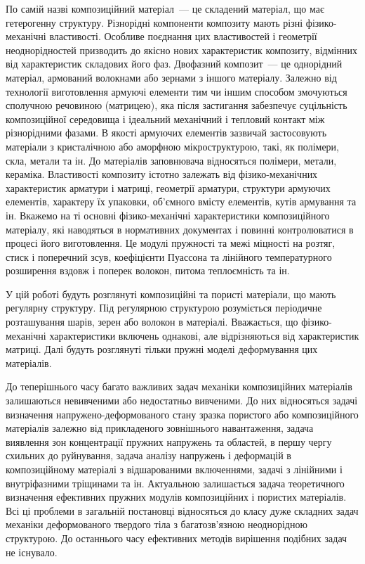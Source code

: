 \documentclass[book,14pt,small,oneside]{ncc}
\begin{document}
По самій назві композиційний матеріал~--- це складений матеріал, що має гетерогенну структуру. Різнорідні компоненти композиту мають різні фізико-механічні властивості. Особливе поєднання цих властивостей і геометрії неоднорідностей призводить до якісно нових характеристик композиту, відмінних від характеристик складових його фаз. Двофазний композит~--- це однорідний матеріал, армований волокнами або зернами з іншого матеріалу. Залежно від технології виготовлення армуючі елементи тим чи іншим способом змочуються сполучною речовиною (матрицею), яка після застигання забезпечує суцільність композиційної середовища і ідеальний механічний і тепловий контакт між різнорідними фазами. В якості армуючих елементів зазвичай застосовують матеріали з кристалічною або аморфною мікроструктурою, такі, як полімери, скла, метали та ін. До матеріалів заповнювача відносяться полімери, метали, кераміка. Властивості композиту істотно залежать від фізико-механічних характеристик арматури і матриці, геометрії арматури, структури армуючих елементів, характеру їх упаковки, об'ємного вмісту елементів, кутів армування та ін. Вкажемо на ті основні фізико-механічні характеристики композиційного матеріалу, які наводяться в нормативних документах і повинні контролюватися в процесі його виготовлення. Це модулі пружності та межі міцності на розтяг, стиск і поперечний зсув, коефіцієнти Пуассона та лінійного температурного розширення вздовж і поперек волокон, питома теплоємність та ін.

У цій роботі будуть розглянуті композиційні та пористі матеріали, що мають регулярну структуру. Під регулярною структурою розуміється періодичне розташування шарів, зерен або волокон в матеріалі. Вважається, що фізико-механічні характеристики включень однакові, але відрізняються від характеристик матриці. Далі будуть розглянуті тільки пружні моделі деформування цих матеріалів.

До теперішнього часу багато важливих задач механіки композиційних матеріалів залишаються невивченими або недостатньо вивченими. До них відносяться задачі визначення напружено-деформованого стану зразка пористого або композиційного матеріалів залежно від прикладеного зовнішнього навантаження, задача виявлення зон концентрації пружних напружень та областей, в першу чергу схильних до руйнування, задача аналізу напружень і деформацій в композиційному матеріалі з відшарованими включеннями, задачі з лінійними і внутріфазними тріщинами та ін. Актуальною залишається задача теоретичного визначення ефективних пружних модулів композиційних і пористих матеріалів. Всі ці проблеми в загальній постановці відносяться до класу дуже складних задач механіки деформованого твердого тіла з багатозв'язною неоднорідною структурою. До останнього часу ефективних методів вирішення подібних задач не існувало.
\end{document}
